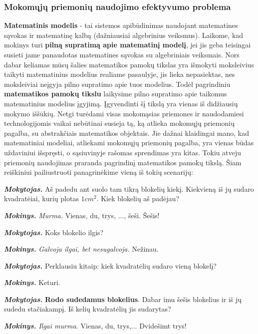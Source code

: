 \documentclass{article}
\begin{document}
\subsubsection{Mokomųjų priemonių naudojimo efektyvumo problema}

\textbf{Matematinis modelis} - tai sistemos apibūdinimas naudojant matematines sąvokas ir matematinę kalbą (dažniausiai algebrinius veiksmus). Laikome, kad mokinys turi \textbf{pilną supratimą apie matematinį modelį}, jei jis geba teisingai susieti jame panaudotas matematines sąvokas su algebriniais veiksmais. Nors dabar keliamas mūsų šalies matematikos pamokų tikslas yra išmokyti moksleivius taikyti matematinius modelius realiame pasaulyje, jis lieka nepasiektas, nes moksleiviai neįgyja pilno supratimo apie tuos modelius. Todėl pagrindiniu \textbf{matematikos pamokų tikslu} laikysime pilno supratimo apie taikomus matematinius modelius įgyjimą. Įgyvendinti šį tikslą yra vienas iš didžiausių mokymo iššūkių. Netgi turėdami visas mokomąsias priemones ir naudodamiesi technologijomis vaikai nebūtinai susieja tą, ką atlieka mokomųjų priemonių pagalba, su abstrakčiais matematikos objektais. Jie dažnai klaidingai mano, kad matematiniai modeliai, atliekami mokomųjų priemonių pagalba, yra vienas būdas uždaviniui išspręsti, o sąsiuvinyje rašomas sprendimas yra kitas. Tokiu atveju priemonių naudojimas praranda pagrindinį matematikos pamokų tikslą. Šiam reiškiniui pailiustruoti panagrinėkime vieną iš tokių scenarijų: \newline

\textit{\textbf{Mokytojas.}} Aš padedu ant suolo tam tikrą blokelių kiekį. Kiekvieną iš jų sudaro kvadratėiai, kurių plotas $1cm^2$. Kiek blokelių aš padėjau?

\textit{\textbf{Mokinys.}} \textit{Murma.} Vienas, du, trys, ..., šeši. Šešis!

\textit{\textbf{Mokytojas.}} Koks blokelio ilgis?

\textit{\textbf{Mokinys.}} \textit{Galvoja ilgai, bet nesugalvoja.} Nežinau.

\textit{\textbf{Mokytojas.}} Perklausiu kitaip: kiek kvadratėlių sudaro vieną blokelį?

\textit{\textbf{Mokinys.}} Keturi.

\textit{\textbf{Mokytojas.}} \textbf{Rodo sudedamus blokelius}. Dabar imu šešis blokelius ir iš jų sudedu stačiakampį. Iš kelių kvadratėlių jis sudarytas? 

\textit{\textbf{Mokinys.}} \textit{Ilgai murma.} Vienas, du, trys,... Dvidešimt trys!\newline
\end{document}
